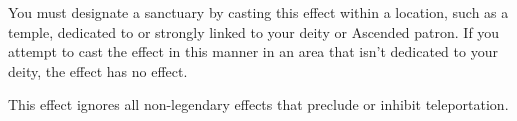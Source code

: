 You must designate a sanctuary by casting this effect within a location, such as a temple, dedicated to or strongly linked to your deity or Ascended patron. If you attempt to cast the effect in this manner in an area that isn't dedicated to your deity, the effect has no effect.

This effect ignores all non-legendary effects that preclude or inhibit teleportation.




